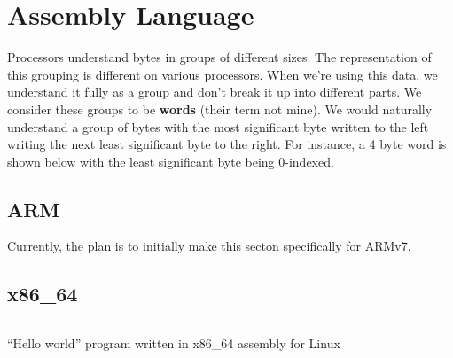 \chapter{Assembly Language}

Processors understand bytes in groups of different sizes. The representation of
this grouping is different on various processors. When we're using this data, we
understand it fully as a group and don't break it up into different parts. We
consider these groups to be \textbf{words} (their term not mine). We would
naturally understand a group of bytes with the most significant byte written to
the left writing the next least significant byte to the right. For instance, a 4
byte word is shown below with the least significant byte being 0-indexed.

\begin{center}
\end{center}

\section{ARM}

Currently, the plan is to initially make this secton specifically for ARMv7.

\section{x86\_64}

\begin{listing}[H]
  \inputminted[frame=lines]{asm}{code/hello_world.asm}
  \caption{``Hello world'' program written in x86\_64 assembly for Linux}
  \label{lst:hello-world-asm}
\end{listing}

